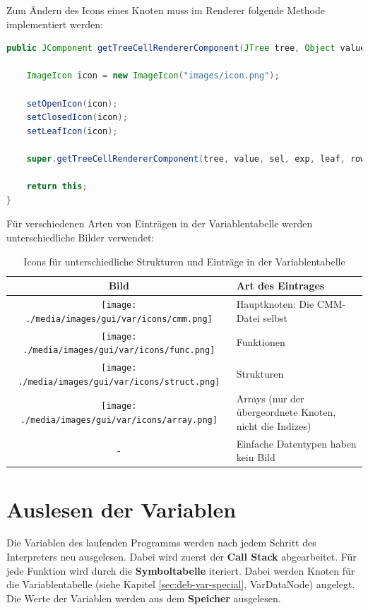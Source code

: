 Zum Ändern des Icons eines Knoten muss im Renderer folgende Methode implementiert werden:
\begin{lstlisting}[language=JAVA]
public JComponent getTreeCellRendererComponent(JTree tree, Object value, boolean sel, boolean exp, boolean leaf, int row, boolean hasFocus) {

	ImageIcon icon = new ImageIcon("images/icon.png");

	setOpenIcon(icon);
	setClosedIcon(icon);
	setLeafIcon(icon);
	
	super.getTreeCellRendererComponent(tree, value, sel, exp, leaf, row, hasFocus);
		
	return this;
}
\end{lstlisting}

Für verschiedenen Arten von Einträgen in der Variablentabelle werden unterschiedliche Bilder verwendet:
\def\arraystretch{1.4}
\begin{table}[h!]
\center
\begin{tabular}{|cl|}
\hline 
Bild & Art des Eintrages \\ 
\hline
\texttt{[image: ./media/images/gui/var/icons/cmm.png]} & Hauptknoten: Die CMM-Datei selbst \\
\texttt{[image: ./media/images/gui/var/icons/func.png]} & Funktionen \\
\texttt{[image: ./media/images/gui/var/icons/struct.png]} & Strukturen \\ 
\texttt{[image: ./media/images/gui/var/icons/array.png]} & Arrays (nur der übergeordnete Knoten, nicht die Indizes) \\ 
- & Einfache Datentypen haben kein Bild\\
\hline 
\end{tabular}
\caption{Icons für unterschiedliche Strukturen und Einträge in der Variablentabelle}
\end{table}

\section{Auslesen der Variablen}

Die Variablen des laufenden Programms werden nach jedem Schritt des Interpreters neu ausgelesen. Dabei wird zuerst der \textbf{Call Stack} abgearbeitet. Für jede Funktion wird durch die \textbf{Symboltabelle} iteriert. Dabei werden Knoten für die Variablentabelle (siehe Kapitel \ref{sec:deb-var-special}, VarDataNode) angelegt. Die Werte der Variablen werden aus dem \textbf{Speicher} ausgelesen.

